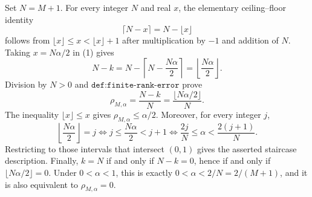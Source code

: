 Set \(N=M+1\). For every integer \(N\) and real \(x\), the elementary ceiling--floor identity
\[\lceil N-x\rceil=N-\lfloor x\rfloor\tag{1}\]
follows from \(\lfloor x\rfloor\le x<\lfloor x\rfloor+1\) after multiplication by \(-1\) and addition of \(N\). Taking \(x=N\alpha/2\) in (1) gives
\[N-k=N-\left\lceil N-\frac{N\alpha}{2}\right\rceil=\left\lfloor\frac{N\alpha}{2}\right\rfloor.\]
Division by \(N>0\) and \(\texttt{def:finite-rank-error}\) prove
\[\rho_{M,\alpha}=\frac{N-k}{N}=\frac{\lfloor N\alpha/2\rfloor}{N}.\]
The inequality \(\lfloor x\rfloor\le x\) gives \(\rho_{M,\alpha}\le\alpha/2\). Moreover, for every integer \(j\),
\[\left\lfloor\frac{N\alpha}{2}\right\rfloor=j\iff j\le\frac{N\alpha}{2}<j+1\iff\frac{2j}{N}\le\alpha<\frac{2(j+1)}{N}.\]
Restricting to those intervals that intersect \((0,1)\) gives the asserted staircase description. Finally, \(k=N\) if and only if \(N-k=0\), hence if and only if \(\lfloor N\alpha/2\rfloor=0\). Under \(0<\alpha<1\), this is exactly \(0<\alpha<2/N=2/(M+1)\), and it is also equivalent to \(\rho_{M,\alpha}=0\).